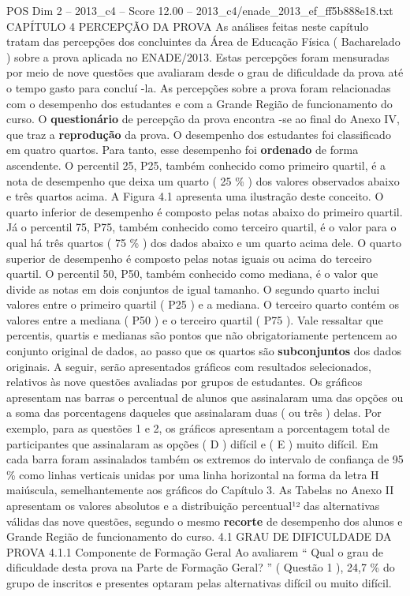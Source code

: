 \begin{textsample}{POS Dim 2 – 2013\_c4 – Score 12.00 – 2013\_c4/enade\_2013\_ef\_ff5b888e18.txt}  \label{ex:f2_pos_068}
CAPÍTULO 4 PERCEPÇÃO DA PROVA As análises feitas neste capítulo tratam das percepções dos concluintes da Área de Educação Física ( Bacharelado ) sobre a prova aplicada no ENADE/2013.
Estas percepções foram mensuradas por meio de nove questões que avaliaram desde o grau de dificuldade da prova até o tempo gasto para concluí -la.
As percepções sobre a prova foram relacionadas com o desempenho dos estudantes e com a Grande Região de funcionamento do curso.
O \textbf{questionário} de percepção da prova encontra -se ao final do Anexo IV, que traz a \textbf{reprodução} da prova.
O desempenho dos estudantes foi classificado em quatro quartos.
Para tanto, esse desempenho foi \textbf{ordenado} de forma ascendente.
O percentil 25, P25, também conhecido como primeiro quartil, é a nota de desempenho que deixa um quarto ( 25 \% ) dos valores observados abaixo e três quartos acima.
A Figura 4.1 apresenta uma ilustração deste conceito.
O quarto inferior de desempenho é composto pelas notas abaixo do primeiro quartil.
Já o percentil 75, P75, também conhecido como terceiro quartil, é o valor para o qual há três quartos ( 75 \% ) dos dados abaixo e um quarto acima dele.
O quarto superior de desempenho é composto pelas notas iguais ou acima do terceiro quartil.
O percentil 50, P50, também conhecido como mediana, é o valor que divide as notas em dois conjuntos de igual tamanho.
O segundo quarto inclui valores entre o primeiro quartil ( P25 ) e a mediana.
O terceiro quarto contém os valores entre a mediana ( P50 ) e o terceiro quartil ( P75 ).
Vale ressaltar que percentis, quartis e medianas são pontos que não obrigatoriamente pertencem ao conjunto original de dados, ao passo que os quartos são \textbf{subconjuntos} dos dados originais.
A seguir, serão apresentados gráficos com resultados selecionados, relativos às nove questões avaliadas por grupos de estudantes.
Os gráficos apresentam nas barras o percentual de alunos que assinalaram uma das opções ou a soma das porcentagens daqueles que assinalaram duas ( ou três ) delas.
Por exemplo, para as questões 1 e 2, os gráficos apresentam a porcentagem total de participantes que assinalaram as opções ( D ) difícil e ( E ) muito difícil.
Em cada barra foram assinalados também os extremos do intervalo de confiança de 95 \% como linhas verticais unidas por uma linha horizontal na forma da letra H maiúscula, semelhantemente aos gráficos do Capítulo 3.
As Tabelas no Anexo II apresentam os valores absolutos e a distribuição percentual¹² das alternativas válidas das nove questões, segundo o mesmo \textbf{recorte} de desempenho dos alunos e Grande Região de funcionamento do curso. 4.1 GRAU DE DIFICULDADE DA PROVA 4.1.1 Componente de Formação Geral Ao avaliarem “ Qual o grau de dificuldade desta prova na Parte de Formação Geral? ” ( Questão 1 ), 24,7 \% do grupo de inscritos e presentes optaram pelas alternativas difícil ou muito difícil.

\end{textsample}
